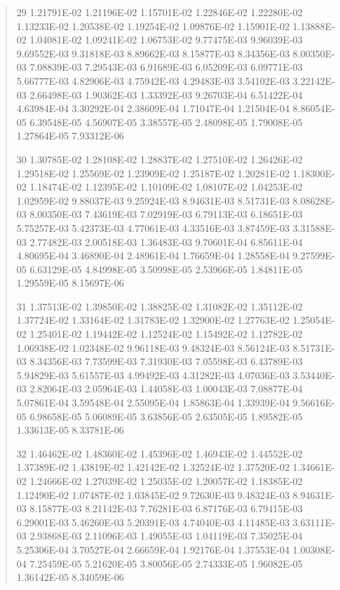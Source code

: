\documentclass[letterpaper,10pt,english]{sphinxmanual}
\begin{document}
\begin{quote}
\begin{DUlineblock}{0em}
\item[] 29   1.21791E-02  1.21196E-02  1.15701E-02  1.22846E-02  1.22280E-02  1.13233E-02  1.20538E-02  1.19254E-02  1.09876E-02  1.15901E-02  1.13888E-02  1.04081E-02  1.09241E-02  1.06753E-02  9.77475E-03  9.96039E-03  9.69552E-03  9.31818E-03  8.89662E-03  8.15877E-03  8.34356E-03  8.00350E-03  7.08839E-03  7.29543E-03  6.91689E-03  6.05209E-03  6.09771E-03  5.66777E-03  4.82906E-03  4.75942E-03  4.29483E-03  3.54102E-03  3.22142E-03  2.66498E-03  1.90362E-03  1.33392E-03  9.26703E-04  6.51422E-04  4.63984E-04  3.30292E-04  2.38609E-04  1.71047E-04  1.21504E-04  8.86054E-05  6.39548E-05  4.56907E-05  3.38557E-05  2.48098E-05  1.79008E-05  1.27864E-05  7.93312E-06
\item[] 30   1.30785E-02  1.28108E-02  1.28837E-02  1.27510E-02  1.26426E-02  1.29518E-02  1.25569E-02  1.23909E-02  1.25187E-02  1.20281E-02  1.18300E-02  1.18474E-02  1.12395E-02  1.10109E-02  1.08107E-02  1.04253E-02  1.02959E-02  9.88037E-03  9.25924E-03  8.94631E-03  8.51731E-03  8.08628E-03  8.00350E-03  7.43619E-03  7.02919E-03  6.79113E-03  6.18651E-03  5.75257E-03  5.42373E-03  4.77061E-03  4.33516E-03  3.87459E-03  3.31588E-03  2.77482E-03  2.00518E-03  1.36483E-03  9.70601E-04  6.85611E-04  4.80695E-04  3.46890E-04  2.48961E-04  1.76659E-04  1.28558E-04  9.27599E-05  6.63129E-05  4.84998E-05  3.50998E-05  2.53966E-05  1.84811E-05  1.29559E-05  8.15697E-06
\item[] 31   1.37513E-02  1.39850E-02  1.38825E-02  1.31082E-02  1.35112E-02  1.37724E-02  1.33164E-02  1.31783E-02  1.32900E-02  1.27763E-02  1.25054E-02  1.25401E-02  1.19442E-02  1.12524E-02  1.15492E-02  1.12782E-02  1.06938E-02  1.02348E-02  9.96118E-03  9.48324E-03  8.56124E-03  8.51731E-03  8.34356E-03  7.73599E-03  7.31930E-03  7.05598E-03  6.43789E-03  5.94829E-03  5.61557E-03  4.99492E-03  4.31282E-03  4.07036E-03  3.53440E-03  2.82064E-03  2.05964E-03  1.44058E-03  1.00043E-03  7.08877E-04  5.07861E-04  3.59548E-04  2.55095E-04  1.85863E-04  1.33939E-04  9.56616E-05  6.98658E-05  5.06089E-05  3.63856E-05  2.63505E-05  1.89582E-05  1.33613E-05  8.33781E-06
\item[] 32   1.46462E-02  1.48360E-02  1.45396E-02  1.46943E-02  1.44552E-02  1.37389E-02  1.43819E-02  1.42142E-02  1.32524E-02  1.37520E-02  1.34661E-02  1.24666E-02  1.27039E-02  1.25035E-02  1.20057E-02  1.18385E-02  1.12490E-02  1.07487E-02  1.03845E-02  9.72630E-03  9.48324E-03  8.94631E-03  8.15877E-03  8.21142E-03  7.76281E-03  6.87176E-03  6.79415E-03  6.29001E-03  5.46260E-03  5.20391E-03  4.74040E-03  4.11485E-03  3.63111E-03  2.93868E-03  2.11096E-03  1.49055E-03  1.04119E-03  7.35025E-04  5.25306E-04  3.70527E-04  2.66659E-04  1.92176E-04  1.37553E-04  1.00308E-04  7.25459E-05  5.21620E-05  3.80056E-05  2.74333E-05  1.96082E-05  1.36142E-05  8.34059E-06

\end{DUlineblock}
\end{quote}
\end{document}
